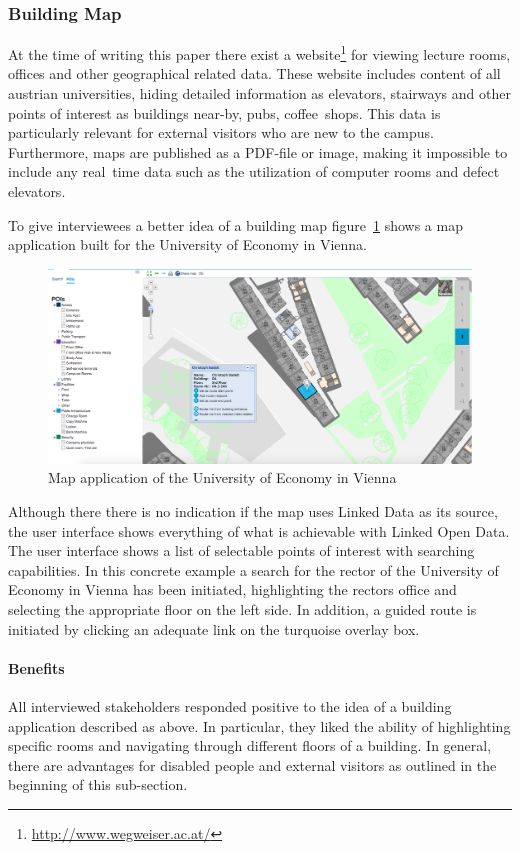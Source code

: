 \documentclass{article}
\begin{document}
\subsubsection{Building Map}
At the time of writing this paper there exist a website\footnote{\url{http://www.wegweiser.ac.at/}} for viewing lecture rooms, offices and other geographical related data. These website includes content of all austrian universities, hiding detailed information as elevators, stairways and other points of interest as buildings near-by, pubs, coffee~shops. 
This data is particularly relevant for external visitors who are new to the campus. Furthermore, maps are published as a PDF-file or image, making it impossible to include any real~time data such as the utilization of computer rooms and defect elevators.

To give interviewees a better idea of a building map figure~\ref{fig:um-map-app} shows a map application built for the University of Economy in Vienna. 
\begin{figure}[H]
	\centering \includegraphics*[width=.8\columnwidth]{map_wu_wien.png}
	\caption{Map application of the University of Economy in Vienna}
	\label{fig:um-map-app}
\end{figure}
Although there there is no indication if the map uses Linked Data as its source, the user interface shows everything of what is achievable with Linked Open Data. 
The user interface shows a list of selectable points of interest with searching capabilities. In this concrete example a search for the rector of the University of Economy in Vienna has been initiated, highlighting the rectors office and selecting the appropriate floor on the left side. In addition, a guided route is initiated by clicking an adequate link on the turquoise overlay box. 
\paragraph{Benefits}
All interviewed stakeholders responded positive to the idea of a building application described as above. In particular, they liked the ability of highlighting specific rooms and navigating through different floors of a building. In general, there are advantages for disabled people and external visitors as outlined in the beginning of this sub-section. 
\end{document}
